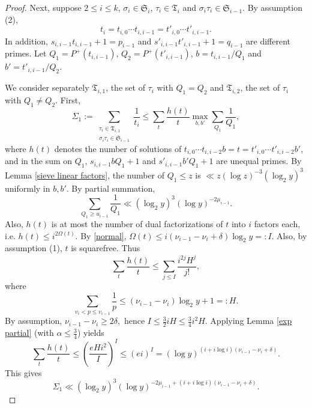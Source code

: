 \documentclass[11pt]{amsart}
\theoremstyle{remark}
\theoremstyle{plain}
\numberwithin{equation}{section}
\newcommand{\be}{\begin{equation}}
\newcommand{\ee}{\end{equation}}
\renewcommand{\a}{\ensuremath{\alpha}}
\renewcommand{\(}{\left(}
\renewcommand{\)}{\right)}
\newcommand{\pfrac}[2]{\left(\frac{#1}{#2}\right)}
\renewcommand{\le}{\leqslant}
\renewcommand{\ge}{\geqslant}
\renewcommand{\d}{\delta}
\newcommand{\om}{\Omega}
\begin{document}
\begin{proof}
Next, suppose $2\le i\le k$, $\sigma_i\in \mathfrak S_i$,
$\tau_i\in \mathfrak T_i$ and $\sigma_i\tau_i\in \mathfrak S_{i-1}$.
By assumption (2),
$$
t_i=t_{i,0} \cdots t_{i,i-1} = t'_{i,0} \cdots t'_{i,i-1}.
$$
In addition, $s_{i,i-1}t_{i,i-1}+1=p_{i-1}$ and 
 $s'_{i,i-1}t'_{i,i-1}+1=q_{i-1}$ 
are different primes. 
Let $Q_1 = P^+(t_{i,i-1})$, $Q_2 = P^+(t'_{i,i-1})$, 
$b=t_{i,i-1}/Q_1$ and $b'=t'_{i,i-1}/Q_2$.

We consider separately $\mathfrak T_{i,1}$, the set of $\tau_i$ with $Q_1=Q_2$
and $\mathfrak T_{i,2}$, the set of $\tau_i$ with $Q_1 \ne Q_2$.
First,
$$
\Sigma_1 := \sum_{\substack{ \tau_i\in \mathfrak T_{i,1} \\ 
\sigma_i\tau_i \in \mathfrak S_{i-1}
} } \frac1{t_i} \le \sum_t \frac{h(t)}{t}\max_{b,b'} \sum_{Q_1} \frac1{Q_1},
$$
where $h(t)$ denotes the number of solutions of
$t_{i,0} \cdots t_{i,i-2} b = t = t'_{i,0} \cdots t'_{i,i-2} b'$,
and in the sum on $Q_1$,
$s_{i,i-1}bQ_1+1$ and $s'_{i,i-1}b'Q_1+1$ are unequal primes.  
By Lemma \ref{sieve linear factors}, the
number of $Q_1\le z$ is $\ll z(\log z)^{-3} (\log_2 y)^3$ uniformly in
$b,b'$.  By partial summation,
\[
\sum_{Q_1\ge u_{i-1}} \frac{1}{Q_1} \ll (\log_2 y)^3 (\log y)^{-2\mu_{i-1}}.
\]
Also, $h(t)$ is at most the number of dual factorizations of $t$ into
$i$ factors each, i.e. $h(t) \le i^{2\om(t)}$.
By \eqref{normal},
$\om(t) \le i(\nu_{i-1} - \nu_{i} +\d)\log_2 y =: I.$
Also, by assumption (1), $t$ is squarefree.
Thus
$$
\sum_t \frac{h(t)}{t} \le \sum_{j\le I} \frac{i^{2j}H^j}{j!},
$$
where
$$
\sum_{v_{i} < p \le v_{i-1}} \frac{1}{p} \le (\nu_{i-1} -
 \nu_{i})\log_2 y + 1 =: H.
$$
By assumption, $\nu_{i-1}-\nu_{i} \ge 2\d,$
hence $I \le \frac32 iH \le \frac34 i^2H$.
Applying Lemma \ref{exp partial}  (with $\a \le \frac34$) yields
\be\label{sum h(t)}
\sum_t \frac{h(t)}{t} \le \pfrac{eHi^2}{I}^I \le (ei)^I 
= (\log y)^{(i+i\log i)(\nu_{i-1}-\nu_{i} + \d)}.
\ee
This gives
\[
\Sigma_1 \ll (\log_2 y)^3 (\log y)^{-2\mu_{i-1} +
(i+i\log i)(\nu_{i-1}-\nu_i + \d) }.
\]


\end{proof}
\end{document}

